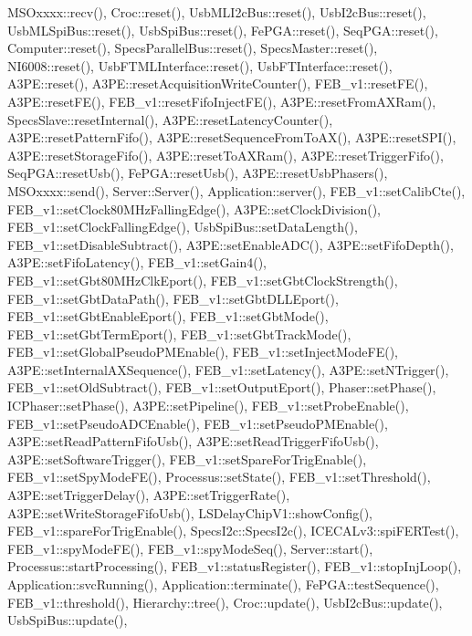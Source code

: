 M\+S\+Oxxxx\+::recv(), Croc\+::reset(), Usb\+M\+L\+I2c\+Bus\+::reset(), Usb\+I2c\+Bus\+::reset(), Usb\+M\+L\+Spi\+Bus\+::reset(), Usb\+Spi\+Bus\+::reset(), Fe\+P\+G\+A\+::reset(), Seq\+P\+G\+A\+::reset(), Computer\+::reset(), Specs\+Parallel\+Bus\+::reset(), Specs\+Master\+::reset(), N\+I6008\+::reset(), Usb\+F\+T\+M\+L\+Interface\+::reset(), Usb\+F\+T\+Interface\+::reset(), A3\+P\+E\+::reset(), A3\+P\+E\+::reset\+Acquisition\+Write\+Counter(), F\+E\+B\+\_\+v1\+::reset\+F\+E(), A3\+P\+E\+::reset\+F\+E(), F\+E\+B\+\_\+v1\+::reset\+Fifo\+Inject\+F\+E(), A3\+P\+E\+::reset\+From\+A\+X\+Ram(), Specs\+Slave\+::reset\+Internal(), A3\+P\+E\+::reset\+Latency\+Counter(), A3\+P\+E\+::reset\+Pattern\+Fifo(), A3\+P\+E\+::reset\+Sequence\+From\+To\+A\+X(), A3\+P\+E\+::reset\+S\+P\+I(), A3\+P\+E\+::reset\+Storage\+Fifo(), A3\+P\+E\+::reset\+To\+A\+X\+Ram(), A3\+P\+E\+::reset\+Trigger\+Fifo(), Seq\+P\+G\+A\+::reset\+Usb(), Fe\+P\+G\+A\+::reset\+Usb(), A3\+P\+E\+::reset\+Usb\+Phasers(), M\+S\+Oxxxx\+::send(), Server\+::\+Server(), Application\+::server(), F\+E\+B\+\_\+v1\+::set\+Calib\+Cte(), F\+E\+B\+\_\+v1\+::set\+Clock80\+M\+Hz\+Falling\+Edge(), A3\+P\+E\+::set\+Clock\+Division(), F\+E\+B\+\_\+v1\+::set\+Clock\+Falling\+Edge(), Usb\+Spi\+Bus\+::set\+Data\+Length(), F\+E\+B\+\_\+v1\+::set\+Disable\+Subtract(), A3\+P\+E\+::set\+Enable\+A\+D\+C(), A3\+P\+E\+::set\+Fifo\+Depth(), A3\+P\+E\+::set\+Fifo\+Latency(), F\+E\+B\+\_\+v1\+::set\+Gain4(), F\+E\+B\+\_\+v1\+::set\+Gbt80\+M\+Hz\+Clk\+Eport(), F\+E\+B\+\_\+v1\+::set\+Gbt\+Clock\+Strength(), F\+E\+B\+\_\+v1\+::set\+Gbt\+Data\+Path(), F\+E\+B\+\_\+v1\+::set\+Gbt\+D\+L\+L\+Eport(), F\+E\+B\+\_\+v1\+::set\+Gbt\+Enable\+Eport(), F\+E\+B\+\_\+v1\+::set\+Gbt\+Mode(), F\+E\+B\+\_\+v1\+::set\+Gbt\+Term\+Eport(), F\+E\+B\+\_\+v1\+::set\+Gbt\+Track\+Mode(), F\+E\+B\+\_\+v1\+::set\+Global\+Pseudo\+P\+M\+Enable(), F\+E\+B\+\_\+v1\+::set\+Inject\+Mode\+F\+E(), A3\+P\+E\+::set\+Internal\+A\+X\+Sequence(), F\+E\+B\+\_\+v1\+::set\+Latency(), A3\+P\+E\+::set\+N\+Trigger(), F\+E\+B\+\_\+v1\+::set\+Old\+Subtract(), F\+E\+B\+\_\+v1\+::set\+Output\+Eport(), Phaser\+::set\+Phase(), I\+C\+Phaser\+::set\+Phase(), A3\+P\+E\+::set\+Pipeline(), F\+E\+B\+\_\+v1\+::set\+Probe\+Enable(), F\+E\+B\+\_\+v1\+::set\+Pseudo\+A\+D\+C\+Enable(), F\+E\+B\+\_\+v1\+::set\+Pseudo\+P\+M\+Enable(), A3\+P\+E\+::set\+Read\+Pattern\+Fifo\+Usb(), A3\+P\+E\+::set\+Read\+Trigger\+Fifo\+Usb(), A3\+P\+E\+::set\+Software\+Trigger(), F\+E\+B\+\_\+v1\+::set\+Spare\+For\+Trig\+Enable(), F\+E\+B\+\_\+v1\+::set\+Spy\+Mode\+F\+E(), Processus\+::set\+State(), F\+E\+B\+\_\+v1\+::set\+Threshold(), A3\+P\+E\+::set\+Trigger\+Delay(), A3\+P\+E\+::set\+Trigger\+Rate(), A3\+P\+E\+::set\+Write\+Storage\+Fifo\+Usb(), L\+S\+Delay\+Chip\+V1\+::show\+Config(), F\+E\+B\+\_\+v1\+::spare\+For\+Trig\+Enable(), Specs\+I2c\+::\+Specs\+I2c(), I\+C\+E\+C\+A\+Lv3\+::spi\+F\+E\+R\+Test(), F\+E\+B\+\_\+v1\+::spy\+Mode\+F\+E(), F\+E\+B\+\_\+v1\+::spy\+Mode\+Seq(), Server\+::start(), Processus\+::start\+Processing(), F\+E\+B\+\_\+v1\+::status\+Register(), F\+E\+B\+\_\+v1\+::stop\+Inj\+Loop(), Application\+::svc\+Running(), Application\+::terminate(), Fe\+P\+G\+A\+::test\+Sequence(), F\+E\+B\+\_\+v1\+::threshold(), Hierarchy\+::tree(), Croc\+::update(), Usb\+I2c\+Bus\+::update(), Usb\+Spi\+Bus\+::update(), 